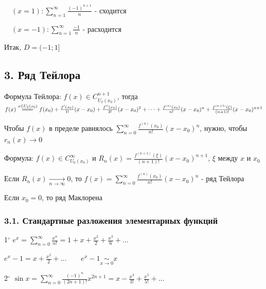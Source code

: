 \documentclass[12pt]{article}
\begin{document}
    $\quad (x = 1): \sum_{n = 1}^\infty \frac{(-1)^{n + 1}}{n}$ - сходится

    $\quad (x = -1): \sum_{n = 1}^\infty \frac{-1}{n}$ - расходится

    Итак, $D = (-1; 1]$

    \subsection{3. Ряд Тейлора}

    \Mem Формула Тейлора: $f(x) \in C^{n + 1}_{U_\delta (x_0)}$, тогда $f(x) \overset{x \in U_\delta (x_0)}{=\joinrel=\joinrel=} f(x_0) + 
    \frac{f^\prime (x_0)}{1!} (x - x_0) + \frac{f^{\prime\prime} (x_0)}{2!} (x - x_0)^2 + \dots + \frac{f^{(n)} (x_0)}{n!} (x - x_0)^n + \frac{f^{(n + 1)} (\xi)}{(n + 1)!} (x - x_0)^{n + 1}$

    Чтобы $f(x)$ в пределе равнялось $\sum_{n = 0}^\infty \frac{f^{(n)}(x_0)}{n!} (x - x_0)^n$, нужно, чтобы $r_n(x) \to 0$


    Формула: $f(x) \in C^\infty_{U_0(x_0)}$ и $R_n(x) = \frac{f^{(n + 1)}(\xi)}{(n + 1)!} (x - x_0)^{n + 1}$, $\xi$ между $x$ и $x_0$

    \begin{MyTheorem}
        \Ths Если $R_n(x) \underset{n \to \infty}{\longrightarrow} 0$, то $f(x) = \sum_{n = 0}^\infty \frac{f^{(n)}(x_0)}{n!} (x - x_0)^n$ - ряд Тейлора
    \end{MyTheorem}

    \Nota Если $x_0 = 0$, то ряд Маклорена 

    \smallvspace

    \subsubsection{3.1. Стандартные разложения элементарных функций}

    \smallvspace

    1$^\circ$ $e^x = \sum_{n = 0}^\infty \frac{x^n}{n!} = 1 + x + \frac{x^2}{2} + \frac{x^3}{6} + \dots$

    \Notas $e^x - 1 = x + \frac{x^2}{2} + \dots \qquad e^x - 1 \underset{x \to 0}{\sim} x$

    \mediumvspace

    2$^\circ$ $\sin x = \sum_{n = 0}^\infty \frac{(-1)^n}{(2n + 1)!}x^{2n + 1} = x - \frac{x^3}{3!} + \frac{x^5}{5!} + \dots$
\end{document}

